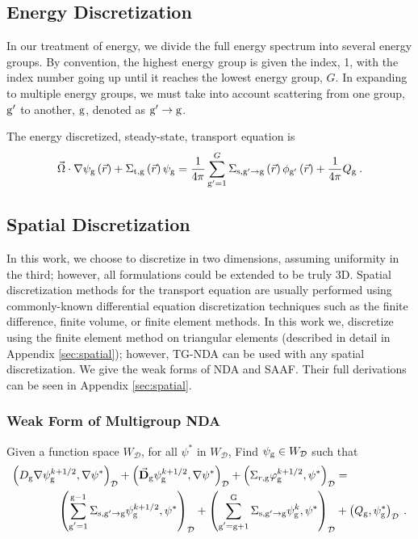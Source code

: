 \subsection{Energy Discretization}
In our treatment of energy, we divide the full energy spectrum into several energy groups. By convention, the highest energy group is given the index, 1, with the index number going up until it reaches the lowest energy group, $G$. In expanding to multiple energy groups, we must take into account scattering from one group, $\mathrm{g}'$ to another, $\mathrm{g}$, denoted as $\mathrm{g}' \rightarrow \mathrm{g} $. 

The energy discretized, steady-state, transport equation is
%
 \begin{equation}
  \vec{\Omega} \cdot \nabla \psi_{\mathrm{g}} \left(\vec{r}\right)+ \Sigma_{\mathrm{t}, \mathrm{g}}\left(\vec{r}\right)\psi_{\mathrm{g}} = \frac{1}{4 \pi} \sum\limits_{\mathrm{g}'=1}^{G}\Sigma_{\mathrm{s}, \mathrm{g}' \rightarrow \mathrm{g}}\left(\vec{r}\right) \phi_{\mathrm{g}'}\left(\vec{r}\right) + \frac{1}{4 \pi} Q_{\mathrm{g}}\:.
  \label{eq:transport-energy}
 \end{equation}


\subsection{Spatial Discretization}
In this work, we choose to discretize in two dimensions, assuming uniformity in the third; however, all formulations could be extended to be truly 3D. Spatial discretization methods for the transport equation are usually performed using commonly-known differential equation discretization techniques such as the finite difference, finite volume, or finite element methods. In this work we, discretize using the finite element method on triangular elements (described in detail in Appendix \ref{sec:spatial}); however, TG-NDA can be used with any spatial discretization. We give the weak forms of NDA and SAAF. Their full derivations can be seen in Appendix \ref{sec:spatial}. 


\subsubsection{Weak Form of Multigroup NDA}

Given a function space $W_\mathcal{D}$, for all $\psi^*$ in $W_\mathcal{D}$, Find $\psi_{\mathrm{g}} \in W_\mathcal{D}$ such that
%
\begin{equation}
 \begin{split}
  \left(D_{\mathrm{g}} \nabla \psi_{\mathrm{g}}^{k+1/2}, \nabla \psi^*\right)_\mathcal{D} + \left(\vec{\bf{D}}_{\mathrm{g}} \psi_{\mathrm{g}}^{k+1/2} , \nabla \psi^*\right)_\mathcal{D} +  \left(\Sigma_{r,\mathrm{g}} \varphi_{\mathrm{g}}^{k+1/2}, \psi^*\right)_\mathcal{D} &=  \\
   \left(\sum\limits_{\substack{\mathrm{g}'=1}}^{\mathrm{g-1}} \Sigma_{\mathrm{s},\mathrm{g}' \to\mathrm{g}}\psi_{\mathrm{g}}^{k+1/2}, \psi^*\right)_\mathcal{D} + \left(\sum\limits_{\substack{\mathrm{g}'=\mathrm{g}+1}}^{\mathrm{G}} \Sigma_{\mathrm{s},\mathrm{g}' \to\mathrm{g}}\psi_{\mathrm{g}}^{k}, \psi^*\right)_\mathcal{D} 
  &+ \left(Q_{\mathrm{g}}, \psi^*_{\mathrm{g}}\right)_\mathcal{D} \:.
 \end{split}
 \label{k1/2}
\end{equation}


